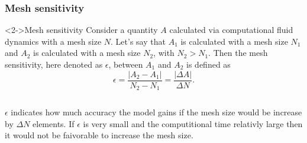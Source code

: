 \documentclass[11pt,t]{beamer}
\begin{document}
    \begin{frame}
        \frametitle{Mesh sensitivity}
        \begin{alertblock}<2->{Mesh sensitivity}
            Consider a quantity $A$ calculated via computational fluid dynamics with a mesh size $N$. Let's say that $A_1$ is calculated with a mesh size $N_1$ 
            and $A_2$ is calculated with a mesh size $N_2$, with $N_2 > N_1$. Then the mesh sensitivity, here denoted as $\epsilon$, between $A_1$ and $A_2$ is defined as 
            $$\epsilon = \frac{|A_2-A_1|}{N_2-N_1}=\frac{|\Delta{A}|}{\Delta{N}}.$$
        \end{alertblock}
        \begin{columns}
            $\epsilon$ indicates how much accuracy the model gains if the mesh size would be increase by $\Delta{N}$ elements. If $\epsilon$ is very small 
            and the computitional time relativly large then it would not be faivorable to increase the mesh size.
        \end{columns}
    \end{frame}
\end{document}
